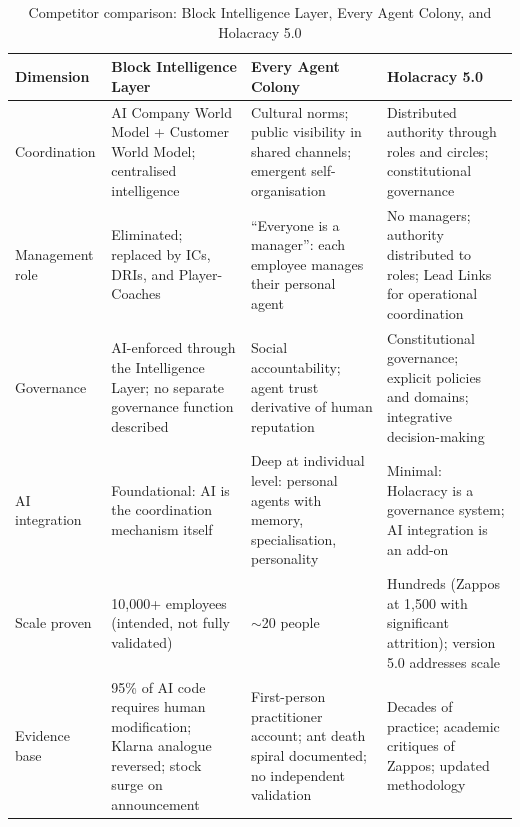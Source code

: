 \begin{table}[H]
\centering
\caption{Competitor comparison: Block Intelligence Layer, Every Agent Colony, and Holacracy 5.0}
\label{tab:competitor-matrix-2}
\footnotesize
\begin{tabularx}{\textwidth}{L{2cm} X X X}
\toprule
\textbf{Dimension} & \textbf{Block Intelligence Layer} & \textbf{Every Agent Colony} & \textbf{Holacracy 5.0} \\
\midrule
Coordination & AI Company World Model + Customer World Model; centralised intelligence & Cultural norms; public visibility in shared channels; emergent self-organisation & Distributed authority through roles and circles; constitutional governance \\
\addlinespace
Management role & Eliminated; replaced by ICs, DRIs, and Player-Coaches & ``Everyone is a manager'': each employee manages their personal agent & No managers; authority distributed to roles; Lead Links for operational coordination \\
\addlinespace
Governance & AI-enforced through the Intelligence Layer; no separate governance function described & Social accountability; agent trust derivative of human reputation & Constitutional governance; explicit policies and domains; integrative decision-making \\
\addlinespace
AI integration & Foundational: AI is the coordination mechanism itself & Deep at individual level: personal agents with memory, specialisation, personality & Minimal: Holacracy is a governance system; AI integration is an add-on \\
\addlinespace
Scale proven & 10,000+ employees (intended, not fully validated) & $\sim$20 people & Hundreds (Zappos at 1,500 with significant attrition); version 5.0 addresses scale \\
\addlinespace
Evidence base & 95\% of AI code requires human modification; Klarna analogue reversed; stock surge on announcement & First-person practitioner account; ant death spiral documented; no independent validation & Decades of practice; academic critiques of Zappos; updated methodology \\
\bottomrule
\end{tabularx}
\end{table}

